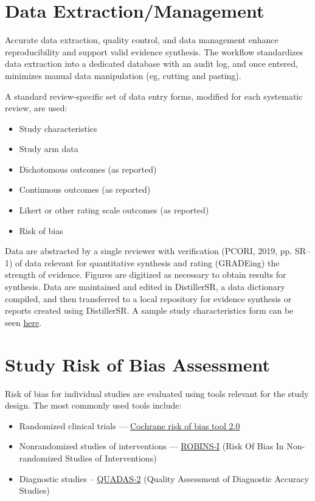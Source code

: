 \documentclass[
  letterpaper,
  DIV=11,
  numbers=noendperiod]{scrreprt}
\providecommand{\tightlist}{%
  \setlength{\itemsep}{0pt}\setlength{\parskip}{0pt}}\usepackage{longtable,booktabs,array}
\begin{document}
\hypertarget{data-extractionmanagement}{%
\section{Data Extraction/Management}\label{data-extractionmanagement}}

Accurate data extraction, quality control, and data management enhance
reproducibility and support valid evidence synthesis. The workflow
standardizes data extraction into a dedicated database with an audit
log, and once entered, minimizes manual data manipulation (eg, cutting
and pasting).

A standard review-specific set of data entry forms, modified for each
systematic review, are used:

\begin{itemize}
\tightlist
\item
  Study characteristics
\item
  Study arm data
\item
  Dichotomous outcomes (as reported)
\item
  Continuous outcomes (as reported)
\item
  Likert or other rating scale outcomes (as reported)
\item
  Risk of bias
\end{itemize}

Data are abstracted by a single reviewer with verification (PCORI, 2019,
pp. SR--1) of data relevant for quantitative synthesis and rating
(GRADEing) the strength of evidence. Figures are digitized as necessary
to obtain results for synthesis. Data are maintained and edited in
DistillerSR, a data dictionary compiled, and then transferred to a local
repository for evidence synthesis or reports created using DistillerSR.
A sample study characteristics form can be seen
\href{assets/studyCharacteristicsGeri.pdf}{here}.

\hypertarget{study-risk-of-bias-assessment}{%
\section{Study Risk of Bias
Assessment}\label{study-risk-of-bias-assessment}}

Risk of bias for individual studies are evaluated using tools relevant
for the study design. The most commonly used tools include:

\begin{itemize}
\tightlist
\item
  Randomized clinical trials ---
  \href{https://sites.google.com/site/riskofbiastool/welcome/rob-2-0-tool/current-version-of-rob-2}{Cochrane
  risk of bias tool 2.0}
\item
  Nonrandomized studies of interventions ---
  \href{https://sites.google.com/site/riskofbiastool/welcome/home}{ROBINS-I}
  (Risk Of Bias In Non-randomized Studies of Interventions)
\item
  Diagnostic studies --
  \href{https://www.bristol.ac.uk/population-health-sciences/projects/quadas/quadas-2/}{QUADAS-2}
  (Quality Assessment of Diagnostic Accuracy Studies)
\end{itemize}
\end{document}
